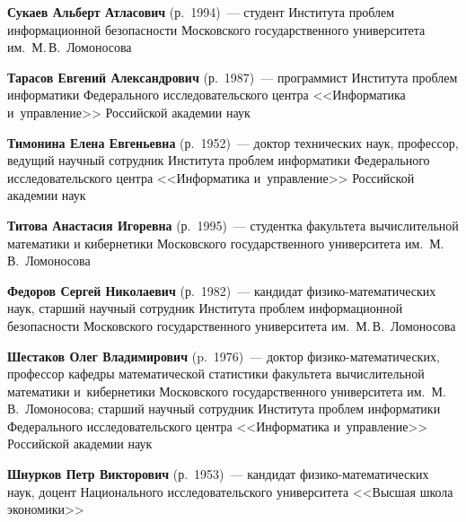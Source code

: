 \begin{multicols}{2}
\noindent
\textbf{Сукаев Альберт Атласович} (р.\ 1994)~--- 
студент Института проб\-лем информационной без\-опас\-ности Московского 
государственного университета им.\ М.\,В.~Ломоносова

\noindent
\textbf{Тарасов Евгений Александрович} (р.\ 1987)~--- 
программист Института проб\-лем информатики Федерального исследовательского центра 
<<Информатика и~управ\-ле\-ние>> Российской академии наук

 
\noindent
\textbf{Тимонина Елена Евгеньевна} (р.\ 1952)~--- доктор технических наук, профессор, 
ведущий научный сотруд\-ник Института проб\-лем информатики Федерального 
исследовательского центра <<Информатика и~управ\-ле\-ние>> Российской академии наук

\noindent
\textbf{Титова Анастасия Игоревна} (р.\ 1995)~--- 
студентка факультета вычислительной математики и кибернетики Московского 
государственного университета им.\ М.\,В.~Ломоносова

\noindent
\textbf{Федоров Сергей Николаевич} (р.\ 1982)~--- 
кандидат фи\-зи\-ко-ма\-те\-ма\-ти\-че\-ских наук, старший научный сотрудник 
Института проб\-лем информационной без\-опас\-ности Московского государственного 
университета им.\ М.\,В.~Ломоносова


\noindent
\textbf{Шестаков Олег Владимирович} (p.\ 1976)~---
доктор фи\-зи\-ко-ма\-те\-ма\-ти\-че\-ских, профессор кафедры математической 
статистики факультета вычислительной математики 
и~кибернетики Московского\linebreak
 государственного университета им.~М.\,В.~Ломоно\-сова;
 старший научный со\-труд\-ник Института \mbox{проб\-лем} информатики Федерального 
 исследовательского центра <<Информатика и~управ\-ле\-ние>> Российской академии наук

\noindent
\textbf{Шнурков Петр Викторович} (р.\ 1953)~--- 
кандидат фи\-зи\-ко-ма\-те\-ма\-ти\-че\-ских наук, доцент Национального 
исследовательского университета <<Высшая школа экономики>>



\def\leftkol{ОБ АВТОРАХ}

\def\rightkol{ОБ АВТОРАХ}


 \label{end\stat}






\end{multicols}

\def\leftkol{ОБ АВТОРАХ}
\def\rightkol{ОБ АВТОРАХ}

\newpage